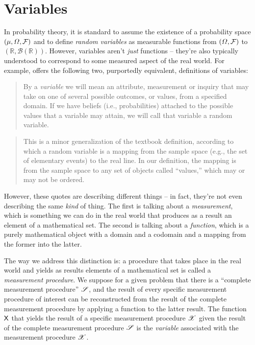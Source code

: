 \section{Variables}\label{sec:variable}

In probability theory, it is standard to assume the existence of a probability space $(\mu,\Omega,\mathcal{F})$ and to define \emph{random variables} as measurable functions from $(\Omega,\mathcal{F})$ to $(\mathbb{R},\mathcal{B}(\mathbb{R}))$. However, variables aren't \emph{just} functions -- they're also typically understood to correspond to some measured aspect of the real world. For example, \citet{pearl_causality:_2009} offers the following two, purportedly equivalent, definitions of variables:
\begin{quote}
By a \emph{variable} we will mean an attribute, measurement or inquiry that may take on one of several possible outcomes, or values, from a specified domain. If we have beliefs (i.e., probabilities) attached to the possible values that a variable may attain, we will call that variable a random variable.
\end{quote}

\begin{quote}
This is a minor generalization of the textbook definition, according to which a random variable is a mapping from the sample space (e.g., the set of elementary events) to the real line. In our definition, the mapping is from the sample space to any set of objects called ``values,'' which may or may not be ordered.
\end{quote}

However, these quotes are describing different things -- in fact, they're not even describing the same \emph{kind} of thing. The first is talking about a \emph{measurement}, which is something we can do in the real world that produces as a result an element of a mathematical set. The second is talking about a \emph{function}, which is a purely mathematical object with a domain and a codomain and a mapping from the former into the latter.

The way we address this distinction is: a procedure that takes place in the real world and yields as results elements of a mathematical set is called a \emph{measurement procedure}. We suppose for a given problem that there is a ``complete measurement procedure'' $\mathscr{S}$, and the result of every specific measurement procedure of interest can be reconstructed from the result of the complete measurement procedure by applying a function to the latter result. The function $\mathsf{X}$ that yields the result of a specific measurement procedure $\mathscr{X}$ given the result of the complete measurement procedure $\mathscr{S}$ is the \emph{variable} associated with the measurement procedure $\mathscr{X}$.

